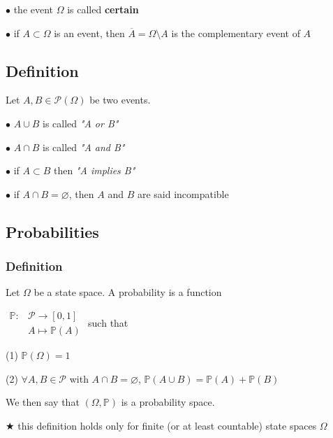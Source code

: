                 \noindent$\bullet$ the event $\Omega$ is called \textbf{certain}

                \noindent$\bullet$ if $A \subset\Omega$ is an event, then $\overline{A}=\Omega\setminus A$ is the complementary event of $A$

            \subsection{Definition}
                Let $A,B\in\mathcal{P}(\Omega)$ be two events.

                $\bullet$ $A\cup B$ is called \textit{"A or B"}

                $\bullet$ $A \cap B$ is called \textit{"A and B"}

                $\bullet$ if $A \subset B$ then \textit{"A implies B"}

                $\bullet$ if $A\cap B=\varnothing$, then $A$ and $B$ are said incompatible

        \subsection{Probabilities}
            \subsubsection{Definition}
                Let $\Omega$ be a state space. A probability is a function 

                \vspace{5pt}
                $\begin{array}{cc}
                    \mathbb{P}:&\mathcal{P}\rightarrow [0,1] \\
                    &A \mapsto \mathbb{P}(A)
                \end{array}$
                such that
                \vspace{5pt}

                (1) $\mathbb{P}(\Omega)=1$
                
                (2) $\forall A,B \in \mathcal{P}$ with $A\cap B = \varnothing$, $\mathbb{P}(A\cup B) = \mathbb{P}(A) + \mathbb{P}(B)$

                We then say that $(\Omega, \mathbb{P})$ is a probability space.

                \vspace{5pt}

                \noindent$\bigstar$ this definition holds only for finite (or at least countable) state spaces $\Omega$

